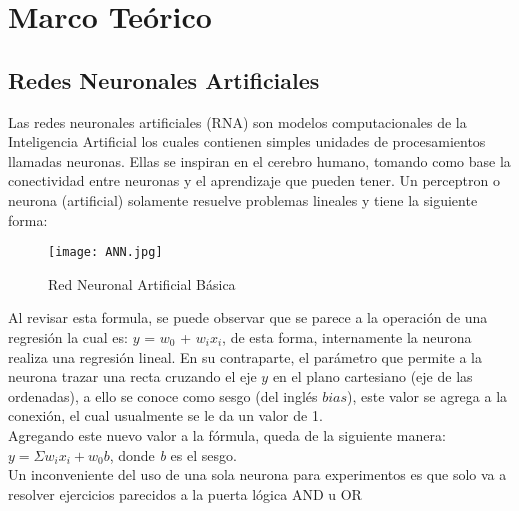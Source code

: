 \section{Marco Teórico}

    \subsection{Redes Neuronales Artificiales}
    	
    	
        Las redes neuronales artificiales (RNA) son modelos computacionales de la Inteligencia Artificial los cuales contienen simples
        unidades de procesamientos llamadas neuronas.  Ellas se inspiran en el cerebro humano, tomando como base la conectividad entre neuronas y el aprendizaje que pueden tener.  Un perceptron o neurona (artificial) solamente resuelve problemas lineales y tiene la 
        siguiente forma:
        \begin{figure}[H]
            \centering
            \texttt{[image: ANN.jpg]}
            \caption{Red Neuronal Artificial B\'asica}
            \label{fig:fig1}
        \end{figure}

        
        Al revisar esta formula, se puede observar que se parece a la operaci\'on de una regresi\'on 
        la cual es:  $y$ = $w_0$ + $w_i$$x_i$,  de esta forma, internamente la neurona realiza una regresi\'on lineal. En su contraparte, el parámetro que permite a la neurona trazar una recta cruzando el eje $y$ en el plano cartesiano (eje de las ordenadas), a ello se conoce como sesgo (del inglés $bias$),  este valor se agrega a la conexi\'on, el cual usualmente se le da un valor de 1. \\
        Agregando este nuevo valor a la f\'ormula, queda de la siguiente manera: $ y = \Sigma w_i x_i + w_0 b$,  donde \textit{b} es el sesgo. \\
        
        Un inconveniente del uso de una sola neurona para experimentos es que solo 
        va a resolver ejercicios parecidos a la puerta l\'ogica AND u OR 
        
